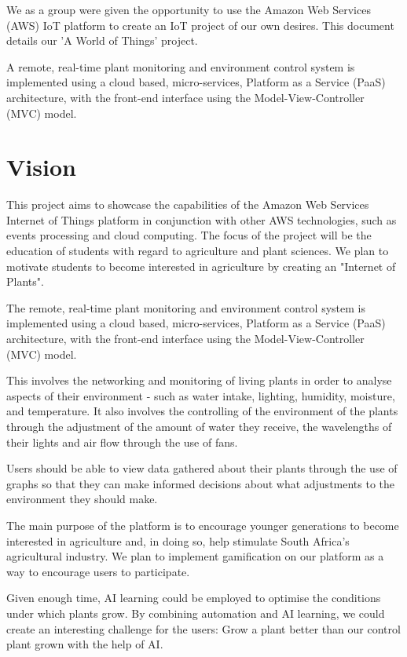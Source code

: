 \documentclass{article}
\begin{document}
	We as a group were given the opportunity to use the Amazon Web Services (AWS) IoT platform to create an IoT project of our own desires. This document details our 'A World of Things' project.
	
	A remote, real-time plant monitoring and environment control system is implemented using a cloud based, micro-services, Platform as a Service (PaaS) architecture, with the front-end interface using the Model-View-Controller (MVC) model.

\section{Vision}
	This project aims to showcase the capabilities of the Amazon Web Services Internet of Things platform in conjunction with other AWS technologies, such as events processing and cloud computing. The focus of the project will be the education of students with regard to agriculture and plant sciences. We plan to motivate students to become interested in agriculture by creating an "Internet of Plants".
	
	The remote, real-time plant monitoring and environment control system is implemented using a cloud based, micro-services, Platform as a Service (PaaS) architecture, with the front-end interface using the Model-View-Controller (MVC) model.
	
	This involves the networking and monitoring of living plants in order to analyse aspects of their environment - such as water intake, lighting, humidity, moisture, and temperature. It also involves the controlling of the environment of the plants through the adjustment of the amount of water they receive, the wavelengths of their lights and air flow through the use of fans.
	
	Users should be able to view data gathered about their plants through the use of graphs so that they can make informed decisions about what adjustments to the environment they should make.
	
	The main purpose of the platform is to encourage younger generations to become interested in agriculture and, in doing so, help stimulate South Africa's agricultural industry. We plan to implement gamification on our platform as a way to encourage users to participate.
	
	Given enough time, AI learning could be employed to optimise the conditions under which plants grow. By combining automation and AI learning, we could create an interesting challenge for the users: Grow a plant better than our control plant grown with the help of AI.
\end{document}
